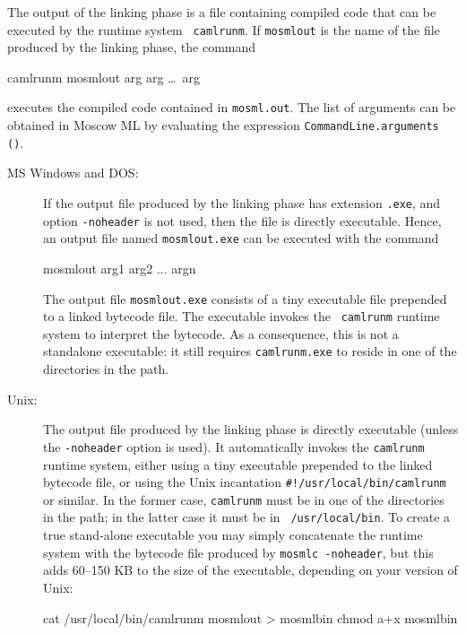 \documentclass[fleqn]{article}
\begin{document}
\noindent The output of the linking phase is a file containing
compiled code that can be executed by the runtime system {\tt
  camlrunm}.  If {\tt mosmlout} is the name of the file produced by the
linking phase, the command

\begin{program}
camlrunm mosmlout arg arg \ldots\ arg
\end{program}

\noindent executes the compiled code contained in {\tt mosml.out}.
The list of arguments can be obtained in Moscow ML by evaluating
the expression {\tt CommandLine.arguments ()}.

\begin{description}
\item[MS Windows and DOS:] If the output file produced by the linking
  phase has extension {\tt .exe}, and option {\tt -noheader} is not
  used, then the file is directly executable.  Hence, an output file
  named {\tt mosmlout.exe} can be executed with the command

\begin{program}
mosmlout arg1 arg2 ... argn    
\end{program}

The output file {\tt mosmlout.exe} consists of a tiny executable file
prepended to a linked bytecode file.  The executable invokes the {\tt
  camlrunm} runtime system to interpret the bytecode.  As a
consequence, this is not a standalone executable: it still requires
{\tt camlrunm.exe} to reside in one of the directories in the path.

\item[Unix:] The output file produced by the linking phase is directly
  executable (unless the {\tt -noheader} option is used).  It
  automatically invokes the {\tt camlrunm} runtime system, either
  using a tiny executable prepended to the linked bytecode file, or
  using the Unix incantation \verb|#!/usr/local/bin/camlrunm| or
  similar.  In the former case, {\tt camlrunm} must be in one of the
  directories in the path; in the latter case it must be in {\tt
    /usr/local/bin}.  To create a true stand-alone executable you may
  simply concatenate the runtime system with the bytecode file
  produced by {\tt mosmlc -noheader}, but this adds 60--150 KB to the
  size of the executable, depending on your version of Unix:

\begin{program}
cat /usr/local/bin/camlrunm mosmlout > mosmlbin
chmod a+x mosmlbin
\end{program}
\end{description}
\end{document}
